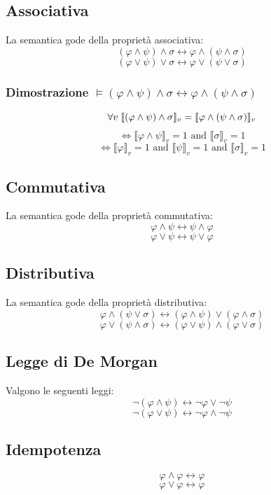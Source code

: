 \documentclass[a4paper,12pt]{report}
\newcommand\val[1]{\llbracket#1\rrbracket}
\begin{document}
\subsection{Associativa}
La semantica gode della propriet\`{a} associativa:
\[(\varphi \wedge \psi) \wedge \sigma \leftrightarrow \varphi \wedge (\psi \wedge \sigma) \]
\[(\varphi \lor \psi) \lor \sigma \leftrightarrow \varphi \lor (\psi \lor \sigma) \]

\subsubsection{Dimostrazione $\vDash(\varphi \wedge \psi) \wedge \sigma \leftrightarrow \varphi \wedge (\psi \wedge \sigma)$}
\[ \forall v \thickspace \val{(\varphi \wedge \psi) \wedge \sigma}_v = \val{\varphi \wedge (\psi \wedge \sigma)}_v\]
\[\iff \val{\varphi \wedge \psi}_v = 1 \text{ and } \val{\sigma}_v=1\]
\[ \iff \val{\varphi}_v = 1 \text{ and } \val{\psi}_v = 1 \text{ and } \val{\sigma}_v = 1 \]

\subsection{Commutativa}
La semantica gode della propriet\`{a} commutativa:
\[ \varphi \wedge \psi \leftrightarrow \psi \wedge \varphi \]
\[ \varphi \lor \psi \leftrightarrow \psi \lor \varphi \]

\subsection{Distributiva}
La semantica gode della propriet\`{a} distributiva:
\[ \varphi \wedge (\psi \lor \sigma) \leftrightarrow (\varphi \wedge \psi) \lor (\varphi \wedge \sigma) \]
\[ \varphi \lor (\psi \wedge \sigma) \leftrightarrow (\varphi \lor \psi) \wedge (\varphi \lor \sigma) \]

\subsection{Legge di De Morgan}
Valgono le seguenti leggi:
\[ \neg(\varphi \wedge \psi) \leftrightarrow \neg \varphi \lor \neg \psi \]
\[ \neg (\varphi \lor \psi) \leftrightarrow \neg \varphi \wedge \neg \psi \]

\subsection {Idempotenza}
\[ \varphi \wedge \varphi \leftrightarrow \varphi \]
\[ \varphi \lor \varphi \leftrightarrow \varphi \]
\end{document}
